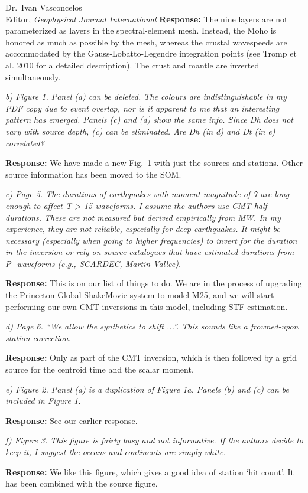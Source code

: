 \documentclass[11pt,a4paper]{letter}
\newcommand{\response}[1]{\textbf{Response:} #1}
\newcommand{\rev}[1]{{\it{#1}}}
\begin{document}
\begin{letter}{Dr.~Ivan Vasconcelos\\
Editor, \textit{Geophysical Journal International}}
\response{The nine layers are not parameterized as layers in the spectral-element mesh. Instead,
the Moho is honored as much as possible by the mesh, whereas the crustal wavespeeds are accommodated by the Gauss-Lobatto-Legendre integration points (see Tromp et al. 2010 for a detailed description). The crust and mantle are inverted simultaneously.}

\rev{b) Figure 1. Panel (a) can be deleted. The colours are indistinguishable in my PDF copy due to event overlap, nor is it apparent to me that an interesting pattern has emerged. Panels (c) and (d) show the same info. Since Dh does not vary with source depth, (c) can be eliminated. Are Dh (in d) and Dt (in e) correlated?
}

\response{We have made a new Fig.~1 with just the sources and stations. Other source information has been moved to the SOM.}

\rev{c) Page 5. The durations of earthquakes with moment magnitude of 7 are long enough to affect T > 15 waveforms. I assume the authors use CMT half durations. These are not measured but derived empirically from MW. In my experience, they are not reliable, especially for deep earthquakes. It might be necessary (especially when going to higher frequencies) to invert for the duration in the inversion or rely on source catalogues that have estimated durations from P- waveforms (e.g., SCARDEC, Martin Vallee).
}

\response{This is on our list of things to do. We are in the process of upgrading the Princeton Global ShakeMovie system to model M25, and we will start performing our own CMT inversions in this model, including STF estimation.}

\rev{d) Page 6. ``We allow the synthetics to shift ...''. This sounds like a frowned-upon station correction.
}

\response{Only as part of the CMT inversion, which is then followed by a grid source for the centroid time and the scalar moment.}

\rev{e) Figure 2. Panel (a) is a duplication of Figure 1a. Panels (b) and (c) can be included in Figure 1.
}

\response{See our earlier response.}

\rev{f) Figure 3. This figure is fairly busy and not informative. If the authors decide to keep it, I suggest the oceans and continents are simply white.
}

\response{We like this figure, which gives a good idea of station `hit count'. It has been combined with the source figure.
}


\end{letter}
\end{document}
